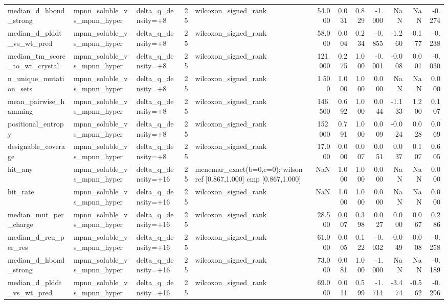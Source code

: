 \begin{table}
{\begin{tabular}{lllrlrrrrrrr}
median\_d\_hbond\_strong & mpnn\_soluble\_vs\_mpnn\_hyper & delta\_q\_density=+8 & 25 & wilcoxon\_signed\_rank & 54.000 & 0.031 & 0.829 & -1.000 & NaN & NaN & -0.274 \\
median\_d\_plddt\_vs\_wt\_pred & mpnn\_soluble\_vs\_mpnn\_hyper & delta\_q\_density=+8 & 25 & wilcoxon\_signed\_rank & 58.000 & 0.004 & 0.234 & -0.855 & -1.260 & -0.177 & -0.238 \\
median\_tm\_score\_to\_wt\_crystal & mpnn\_soluble\_vs\_mpnn\_hyper & delta\_q\_density=+8 & 25 & wilcoxon\_signed\_rank & 121.000 & 0.275 & 1.000 & -0.001 & -0.008 & 0.001 & -0.030 \\
n\_unique\_mutation\_sets & mpnn\_soluble\_vs\_mpnn\_hyper & delta\_q\_density=+8 & 25 & wilcoxon\_signed\_rank & 1.500 & 1.000 & 1.000 & 0.000 & NaN & NaN & 0.000 \\
mean\_pairwise\_hamming & mpnn\_soluble\_vs\_mpnn\_hyper & delta\_q\_density=+8 & 25 & wilcoxon\_signed\_rank & 146.500 & 0.692 & 1.000 & 0.044 & -1.133 & 1.200 & 0.107 \\
positional\_entropy & mpnn\_soluble\_vs\_mpnn\_hyper & delta\_q\_density=+8 & 25 & wilcoxon\_signed\_rank & 152.000 & 0.791 & 1.000 & 0.009 & -0.024 & 0.028 & 0.069 \\
designable\_coverage & mpnn\_soluble\_vs\_mpnn\_hyper & delta\_q\_density=+8 & 25 & wilcoxon\_signed\_rank & 17.000 & 0.000 & 0.007 & 0.051 & 0.037 & 0.107 & 0.605 \\
hit\_any & mpnn\_soluble\_vs\_mpnn\_hyper & delta\_q\_density=+16 & 25 & mcnemar\_exact(b=0,c=0); wilson ref [0.867,1.000] cmp [0.867,1.000] & NaN & 1.000 & 1.000 & 0.000 & NaN & NaN & 0.000 \\
hit\_rate & mpnn\_soluble\_vs\_mpnn\_hyper & delta\_q\_density=+16 & 25 & wilcoxon\_signed\_rank & NaN & 1.000 & 1.000 & 0.000 & NaN & NaN & 0.000 \\
median\_mut\_per\_charge & mpnn\_soluble\_vs\_mpnn\_hyper & delta\_q\_density=+16 & 25 & wilcoxon\_signed\_rank & 28.500 & 0.007 & 0.398 & 0.027 & 0.000 & 0.067 & 0.286 \\
median\_d\_reu\_per\_res & mpnn\_soluble\_vs\_mpnn\_hyper & delta\_q\_density=+16 & 25 & wilcoxon\_signed\_rank & 61.000 & 0.005 & 0.122 & -0.032 & -0.049 & -0.008 & -0.258 \\
median\_d\_hbond\_strong & mpnn\_soluble\_vs\_mpnn\_hyper & delta\_q\_density=+16 & 25 & wilcoxon\_signed\_rank & 73.000 & 0.081 & 1.000 & -1.000 & NaN & NaN & -0.189 \\
median\_d\_plddt\_vs\_wt\_pred & mpnn\_soluble\_vs\_mpnn\_hyper & delta\_q\_density=+16 & 25 & wilcoxon\_signed\_rank & 69.000 & 0.011 & 0.599 & -1.714 & -3.474 & -0.562 & -0.296 \\

\end{tabular}}
\end{table}
